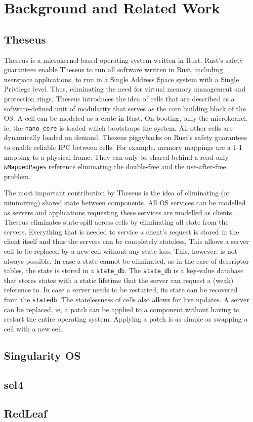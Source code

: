 
\chapter{Background and Related Work}

\label{Chapter2}



\section{Theseus}
Theseus\cite{theseus} is a microkernel based operating system written in Rust. Rust's safety guarantees enable Theseus to run all software written in Rust, including userspace applications, to run in a Single Address Space system with a Single Privilege level. Thus, eliminating the need for virtual memory management and protection rings. Theseus introduces the idea of cells that are described as a software-defined unit of modularity that serves as the core building block of the OS. A cell can be modeled as a crate in Rust. On booting, only the microkernel, ie, the \lstinline{nano_core} is loaded which bootstraps the system. All other cells are dynamically loaded on demand. 
Theseus piggybacks on Rust's safety guarantees to enable reliable IPC between cells. For example, memory mappings are a 1-1 mapping to a physical frame. They can only be shared behind a read-only \lstinline{&MappedPages} reference eliminating the double-free and the use-after-free problem. 

The most important contribution by Theseus is the idea of eliminating (or minimizing) shared state between components. All OS services can be modelled as servers and applications requesting these services are modelled as clients. Theseus eliminates state-spill\cite{state-spill} across cells by eliminating all state from the servers. Everything that is needed to service a client's request is stored in the client itself and thus the servers can be completely stateless. This allows a server cell to be replaced by a new cell without any state loss. This, however, is not always possible. In case a state cannot be eliminated, as in the case of descriptor tables, the state is stored in a \lstinline{state_db}. The \lstinline{state_db} is a key-value database that stores states with a static lifetime that the server can request a (weak) reference to. In case a server needs to be restarted, its state can be recovered from the \lstinline{statedb}. The statelessness of cells also allows for live updates. A server can be replaced, ie, a patch can be applied to a component without having to restart the entire operating system. Applying a patch is as simple as swapping a cell with a new cell.


\section{Singularity OS}

\section{sel4}

\section{RedLeaf}
